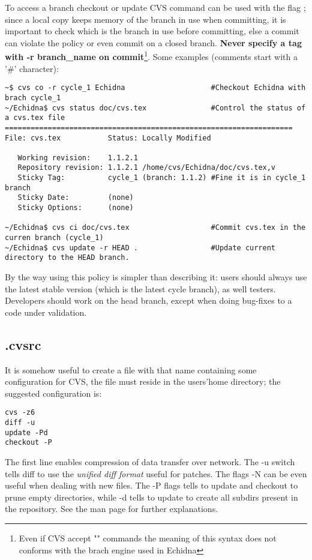 To access a branch checkout or update CVS command can be used with the flag ; since a local 
copy keeps memory of the branch in use when committing, it is important to check which is the branch in use before 
committing, else a commit can violate the policy or even commit on a closed branch.
{\bf Never specify a tag with -r branch\_name on commit}\footnote{Even if CVS accept ""
commands the meaning of this syntax does not conforms with the brach engine used in Echidna}. 
Some examples (comments start with a '\#' character):


\begin{verbatim}
~$ cvs co -r cycle_1 Echidna                    #Checkout Echidna with brach cycle_1
~/Echidna$ cvs status doc/cvs.tex               #Control the status of a cvs.tex file
===================================================================
File: cvs.tex           Status: Locally Modified

   Working revision:    1.1.2.1
   Repository revision: 1.1.2.1 /home/cvs/Echidna/doc/cvs.tex,v
   Sticky Tag:          cycle_1 (branch: 1.1.2) #Fine it is in cycle_1 branch
   Sticky Date:         (none)
   Sticky Options:      (none)

~/Echidna$ cvs ci doc/cvs.tex                   #Commit cvs.tex in the curren branch (cycle_1)
~/Echidna$ cvs update -r HEAD .                 #Update current directory to the HEAD branch.
\end{verbatim}

By the way using this policy is simpler than describing it: users should always use the latest stable version (which
is the latest cycle branch), as well testers. Developers should work on the head branch, except when doing bug-fixes
to a code under validation.

\subsection{.cvsrc}
It is somehow useful to create a file with that name containing some configuration for CVS, the file must reside in the 
users'home directory; the suggested configuration is:
\begin{verbatim}
cvs -z6
diff -u
update -Pd
checkout -P
\end{verbatim}

The first line enables compression of data transfer over network.
The -u switch tells diff to use the {\it unified diff format} useful for patches. The flags -N can be even useful when dealing with new files.
The -P flags tells to update and checkout to prune empty directories, while -d tells to update to create all subdirs present in the repository.
See the man page for further explanations.

